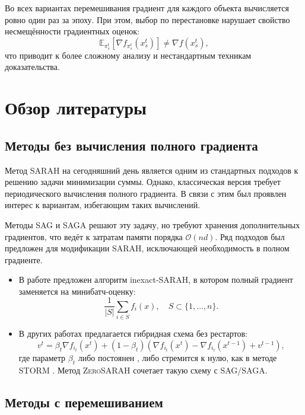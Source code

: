 Во всех вариантах перемешивания градиент для каждого объекта вычисляется ровно один раз за эпоху. При этом, выбор по перестановке нарушает свойство несмещённости градиентных оценок:
\[
\mathbb{E}_{\pi_s^t} \left[\nabla f_{\pi_s^t}(x_s^t)\right] \neq \nabla f(x_s^t),
\]
что приводит к более сложному анализу и нестандартным техникам доказательства.

\section{Обзор литературы}

\subsection*{Методы без вычисления полного градиента}

Метод \textsc{SARAH} на сегодняшний день является одним из стандартных подходов к решению задачи минимизации суммы. Однако, классическая версия требует периодического вычисления полного градиента. В связи с этим был проявлен интерес к вариантам, избегающим таких вычислений.

Методы \textsc{SAG} и \textsc{SAGA} решают эту задачу, но требуют хранения дополнительных градиентов, что ведёт к затратам памяти порядка \(\mathcal{O}(nd)\). Ряд подходов был предложен для модификации \textsc{SARAH}, исключающей необходимость в полном градиенте.

\begin{itemize}
    \item В работе \citep{nguyen2021inexact} предложен алгоритм inexact-\textsc{SARAH}, в котором полный градиент заменяется на минибатч-оценку:
    \[
    \frac{1}{|S|} \sum_{i \in S} f_i(x), \quad S \subset \{1, \ldots, n\}.
    \]
    \item В других работах предлагается гибридная схема без рестартов:
    \[
    v^t = \beta_t \nabla f_{i_t}(x^t) + (1 - \beta_t)(\nabla f_{i_t}(x^t) - \nabla f_{i_t}(x^{t-1}) + v^{t-1}),
    \]
    где параметр \(\beta_t\) либо постоянен \citep{liu2020optimal}, либо стремится к нулю, как в методе \textsc{STORM} \citep{cutkosky2019momentum}. Метод \textsc{ZeroSARAH} \citep{li2021zerosarah} сочетает такую схему с \textsc{SAG/SAGA}.
\end{itemize}

\subsection*{Методы с перемешиванием}

